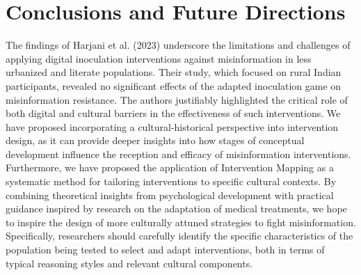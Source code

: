 \documentclass[authordate, empirical]{jote-new-article}
\begin{document}
	\section{Conclusions and Future Directions}



	The findings of Harjani et al. (2023) underscore the limitations and challenges of applying digital inoculation interventions against misinformation in less urbanized and literate populations. Their study, which focused on rural Indian participants, revealed no significant effects of the adapted inoculation game on misinformation resistance. The authors justifiably highlighted the critical role of both digital and cultural barriers in the effectiveness of such interventions. We have proposed incorporating a cultural-historical perspective into intervention design, as it can provide deeper insights into how stages of conceptual development influence the reception and efficacy of misinformation interventions. Furthermore, we have proposed the application of Intervention Mapping as a systematic method for tailoring interventions to specific cultural contexts. By combining theoretical insights from psychological development with practical guidance inspired by research on the adaptation of medical treatments, we hope to inspire the design of more culturally attuned strategies to fight misinformation. Specifically, researchers should carefully identify the specific characteristics of the population being tested to select and adapt interventions, both in terms of typical reasoning styles and relevant cultural components.
\end{document}
